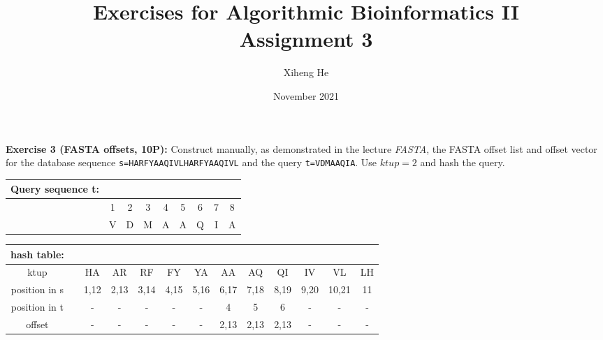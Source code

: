 \documentclass{article}
\title{Exercises for Algorithmic Bioinformatics II\\
Assignment 3}
\author{Xiheng He}
\date{November 2021}
\begin{document}
{\let\newpage\relax\maketitle}
\begin{flushleft}
\textbf{Exercise 3 (FASTA offsets, 10P):}
\newline
Construct manually, as demonstrated in the lecture \emph{FASTA}, the FASTA offset list and offset vector
for the database sequence \texttt{s=HARFYAAQIVLHARFYAAQIVL} and the query \texttt{t=VDMAAQIA}. Use $ktup = 2$
and hash the query.
\begin{center}
\begin{tabular}{ccccccccc}
    Query sequence t: \\
    \hline
    &1&2&3&4&5&6&7&8 \\
    \rowcolor{blue}&V&D&M&A&A&Q&I&A \\
    \hline
\end{tabular}
\begin{tabular}{cc|c|c|c|c|c|c|c|c|c|c|c}
    hash table: \\
    \hline
    ktup& &HA&AR&RF&FY&YA&AA&AQ&QI&IV&VL&LH \\
    \hline
    position in s& &1,12&2,13&3,14&4,15&5,16&6,17&7,18&8,19&9,20&10,21&11 \\ 
    \hline
    position in t& &-&-&-&-&-&4&5&6&-&-&- \\
    \hline
    offset& &-&-&-&-&-&2,13&2,13&2,13&-&-&- \\
    \hline
\end{tabular}
\end{center}
\end{flushleft}
\end{document}

